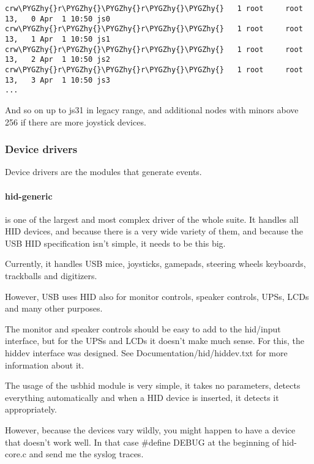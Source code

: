 \documentclass[a4paper,8pt,english]{sphinxmanual}
\def\PYGZhy{\char`\-}
\begin{document}
\begin{Verbatim}[commandchars=\\\{\}]
crw\PYGZhy{}r\PYGZhy{}\PYGZhy{}r\PYGZhy{}\PYGZhy{}   1 root     root      13,   0 Apr  1 10:50 js0
crw\PYGZhy{}r\PYGZhy{}\PYGZhy{}r\PYGZhy{}\PYGZhy{}   1 root     root      13,   1 Apr  1 10:50 js1
crw\PYGZhy{}r\PYGZhy{}\PYGZhy{}r\PYGZhy{}\PYGZhy{}   1 root     root      13,   2 Apr  1 10:50 js2
crw\PYGZhy{}r\PYGZhy{}\PYGZhy{}r\PYGZhy{}\PYGZhy{}   1 root     root      13,   3 Apr  1 10:50 js3
...
\end{Verbatim}

And so on up to js31 in legacy range, and additional nodes with minors
above 256 if there are more joystick devices.


\subsubsection{Device drivers}
\label{input/input:id2}
Device drivers are the modules that generate events.


\paragraph{hid-generic}
\label{input/input:hid-generic}
 is one of the largest and most complex driver of the
whole suite. It handles all HID devices, and because there is a very
wide variety of them, and because the USB HID specification isn't
simple, it needs to be this big.

Currently, it handles USB mice, joysticks, gamepads, steering wheels
keyboards, trackballs and digitizers.

However, USB uses HID also for monitor controls, speaker controls, UPSs,
LCDs and many other purposes.

The monitor and speaker controls should be easy to add to the hid/input
interface, but for the UPSs and LCDs it doesn't make much sense. For this,
the hiddev interface was designed. See Documentation/hid/hiddev.txt
for more information about it.

The usage of the usbhid module is very simple, it takes no parameters,
detects everything automatically and when a HID device is inserted, it
detects it appropriately.

However, because the devices vary wildly, you might happen to have a
device that doesn't work well. In that case \#define DEBUG at the beginning
of hid-core.c and send me the syslog traces.
\end{document}
